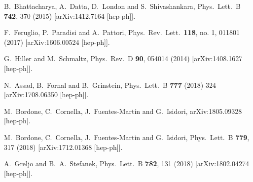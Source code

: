 \documentclass[aps,prd,superscriptaddress,twocolumn,secnumarabic]{revtex4-1}
\begin{document}
\begin{thebibliography}{99}
  B.~Bhattacharya, A.~Datta, D.~London and S.~Shivashankara,
  Phys.\ Lett.\ B {\bf 742}, 370 (2015)
  [arXiv:1412.7164 [hep-ph]].


  F.~Feruglio, P.~Paradisi and A.~Pattori,
  Phys.\ Rev.\ Lett.\  {\bf 118}, no. 1, 011801 (2017)
  [arXiv:1606.00524 [hep-ph]].

 G.~Hiller and M.~Schmaltz,
  Phys.\ Rev.\ D {\bf 90}, 054014 (2014)
  [arXiv:1408.1627 [hep-ph]].


  N.~Assad, B.~Fornal and B.~Grinstein,
  Phys.\ Lett.\ B {\bf 777} (2018) 324
  [arXiv:1708.06350 [hep-ph]].
  
  M.~Bordone, C.~Cornella, J.~Fuentes-Martín and G.~Isidori,
  arXiv:1805.09328 [hep-ph].


  M.~Bordone, C.~Cornella, J.~Fuentes-Martin and G.~Isidori,
  Phys.\ Lett.\ B {\bf 779}, 317 (2018)
  [arXiv:1712.01368 [hep-ph]].


  A.~Greljo and B.~A.~Stefanek,
  Phys.\ Lett.\ B {\bf 782}, 131 (2018)
  [arXiv:1802.04274 [hep-ph]].



\end{thebibliography}
\end{document}
